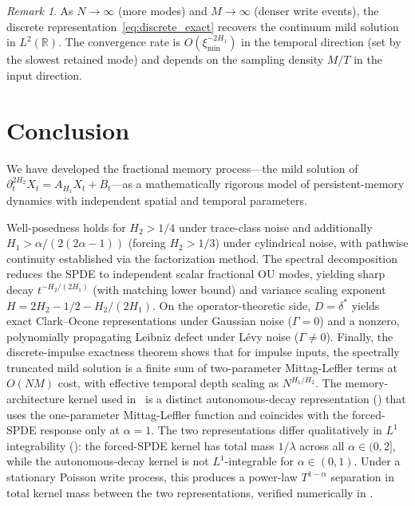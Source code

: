 \documentclass[11pt]{article}
\theoremstyle{definition}
\theoremstyle{remark}
\newtheorem{remark}[theorem]{Remark}
\newcommand{\R}{\mathbb{R}}
\begin{document}
\begin{remark}
As $N \to \infty$ (more modes) and $M \to \infty$
(denser write events), the discrete
representation~\eqref{eq:discrete_exact} recovers
the continuum mild solution in $L^2(\R)$.  The
convergence rate is $O(\xi_{\min}^{-2H_1})$ in the
temporal direction (set by the slowest retained
mode) and depends on the sampling density $M/T$
in the input direction.
\end{remark}

\section{Conclusion}\label{sec:conclusion}

We have developed the fractional memory process---the
mild solution of $\partial_t^{2H_2} X_t = A_{H_1} X_t
+ \dot{B}_t$---as a mathematically rigorous model of
persistent-memory dynamics with independent spatial and
temporal parameters.

Well-posedness holds for $H_2 > 1/4$ under trace-class
noise and additionally $H_1 > \alpha/(2(2\alpha-1))$
(forcing $H_2 > 1/3$) under cylindrical
noise, with pathwise continuity established via the
factorization method.  The spectral decomposition
reduces the SPDE to independent scalar fractional OU
modes, yielding sharp decay $t^{-H_2/(2H_1)}$ (with
matching lower bound) and variance scaling exponent
$H = 2H_2 - 1/2 - H_2/(2H_1)$.  On the operator-theoretic side, $D = \delta^*$ yields exact
Clark--Ocone representations under Gaussian noise
($\Gamma = 0$) and a nonzero, polynomially propagating
Leibniz defect under L\'evy noise ($\Gamma \neq 0$).
Finally, the discrete-impulse exactness theorem shows
that for impulse inputs, the spectrally truncated mild
solution is a finite sum of two-parameter
Mittag-Leffler terms at $O(NM)$ cost, with effective
temporal depth scaling as $N^{H_1/H_2}$.  The
memory-architecture kernel used
in~\cite{fontes2026arch} is a distinct
autonomous-decay representation ()
that uses the one-parameter Mittag-Leffler function
and coincides with the forced-SPDE response only at
$\alpha = 1$.  The two representations differ
qualitatively in $L^1$ integrability
(): the forced-SPDE kernel
has total mass $1/\lambda$ across all $\alpha \in
(0, 2]$, while the autonomous-decay kernel is not
$L^1$-integrable for $\alpha \in (0, 1)$.  Under a
stationary Poisson write process, this produces a
power-law $T^{1-\alpha}$ separation in total kernel
mass between the two representations, verified
numerically in .
\end{document}
